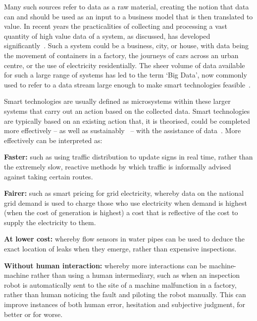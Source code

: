 \documentclass[conference]{IEEEtran}
\begin{document}
Many such sources refer to data as a raw material, creating the notion
that data can and should be used as an input to a business model that
is then translated to value. In recent years the practicalities of
collecting and processing a vast quantity of high value data of a
system, as discussed, has developed
significantly~\cite{arup-et-al:2011}. Such a system could be a
business, city, or house, with data being the movement of containers
in a factory, the journeys of cars across an urban centre, or the use
of electricity residentially. The sheer volume of data available for
such a large range of systems has led to the term `Big Data’, now
commonly used to refer to a data stream large enough to make smart
technologies
feasible~\cite{hollands:2008,ibmsmartcities:2009,ciscoconcities:2010}.

Smart technologies are usually defined as microsystems within these
larger systems that carry out an action based on the collected
data. Smart technologies are typically based on an existing action
that, it is theorised, could be completed more effectively -- as well
as sustainably~\cite{cosgrave-et-al:2014} -- with the assistance of
data~\cite{arup-et-al:2011}. More effectively can be interpreted as:

\begin{compactitem}
\item {\textbf{Faster:}} such as using traffic distribution to update
  signs in real time, rather than the extremely slow, reactive methods
  by which traffic is informally advised against taking certain
  routes.
\item {\textbf{Fairer:}} such as smart pricing for grid electricity,
  whereby data on the national grid demand is used to charge those who
  use electricity when demand is highest (when the cost of generation
  is highest) a cost that is reflective of the cost to supply the
  electricity to them. 
\item {\textbf{At lower cost:}} whereby flow sensors in water pipes
  can be used to deduce the exact location of leaks when they emerge,
  rather than expensive inspections.
\item {\textbf{Without human interaction:}} whereby more interactions
  can be machine-machine rather than using a human intermediary, such
  as when an inspection robot is automatically sent to the site of a
  machine malfunction in a factory, rather than human noticing the
  fault and piloting the robot manually. This can improve instances of
  both human error, hesitation and subjective judgment, for better or
  for worse. 
\end{compactitem}
\end{document}
